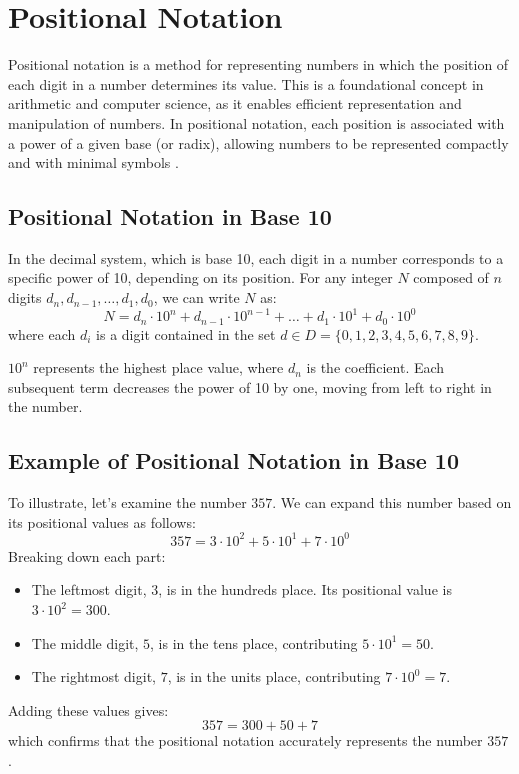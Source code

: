 
\section{Positional Notation}

Positional notation is a method for representing numbers in which the position of each digit in a number determines its value. This is a foundational concept in arithmetic and computer science, as it enables efficient representation and manipulation of numbers. In positional notation, each position is associated with a power of a given base (or radix), allowing numbers to be represented compactly and with minimal symbols \cite{ross2008}.

\subsection{Positional Notation in Base 10}

In the decimal system, which is base 10, each digit in a number corresponds to a specific power of 10, depending on its position. For any integer \( N \) composed of \( n \) digits \( d_n, d_{n-1}, \ldots, d_1, d_0 \), we can write \( N \) as:
\[
N = d_n \cdot 10^n + d_{n-1} \cdot 10^{n-1} + \ldots + d_1 \cdot 10^1 + d_0 \cdot 10^0
\]
where each \( d_i \) is a digit contained in the set \(d \in D = \{0, 1, 2, 3, 4, 5, 6, 7, 8, 9\}
 \). 
 \vspace{\baselineskip}\par
 \( 10^n \) represents the highest place value, where \( d_n \) is the coefficient.
Each subsequent term decreases the power of 10 by one, moving from left to right in the number.

\subsection{Example of Positional Notation in Base 10}

To illustrate, let’s examine the number \( 357 \). We can expand this number based on its positional values as follows:
\[
357 = 3 \cdot 10^2 + 5 \cdot 10^1 + 7 \cdot 10^0
\]
Breaking down each part:
\begin{itemize}
    \item The leftmost digit, \( 3 \), is in the hundreds place. Its positional value is \( 3 \cdot 10^2 = 300 \).
    \item The middle digit, \( 5 \), is in the tens place, contributing \( 5 \cdot 10^1 = 50 \).
    \item The rightmost digit, \( 7 \), is in the units place, contributing \( 7 \cdot 10^0 = 7 \).
\end{itemize}
Adding these values gives:
\[
357 = 300 + 50 + 7
\]
which confirms that the positional notation accurately represents the number \( 357 \).

